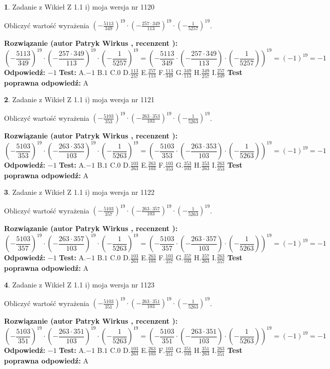 \documentclass[12pt, a4paper]{article}
\theoremstyle{definition} %
\newtheorem{zad}{}
\newcommand{\zadStart}[1]{\begin{zad}#1\newline}
\newcommand{\zadStop}{\end{zad}}
\newcommand{\rozwStart}[2]{\noindent \textbf{Rozwiązanie (autor #1 , recenzent #2): }\newline}
\newcommand{\rozwStop}{\newline}
\newcommand{\odpStart}{\noindent \textbf{Odpowiedź:}\newline}
\newcommand{\odpStop}{\newline}
\newcommand{\testStart}{\noindent \textbf{Test:}\newline}
\newcommand{\testStop}{\newline}
\newcommand{\kluczStart}{\noindent \textbf{Test poprawna odpowiedź:}\newline}
\newcommand{\kluczStop}{\newline}
\begin{document}
\zadStart{Zadanie z Wikieł Z 1.1 i) moja wersja nr 1120}

Obliczyć wartość wyrażenia $(-\frac{5113}{349})^{19} \cdot (-\frac{257 \cdot 349}{113})^{19} \cdot (-\frac{1}{5257})^{19}$.
\zadStop
\rozwStart{Patryk Wirkus}{}
$$(-\frac{5113}{349})^{19} \cdot (-\frac{257 \cdot 349}{113})^{19} \cdot (-\frac{1}{5257})^{19} = (-\frac{5113}{349} \cdot (-\frac{257 \cdot 349}{113}) \cdot (-\frac{1}{5257}))^{19} = (-1)^{19} = -1$$
\rozwStop
\odpStart
$-1$
\odpStop
\testStart
A.$-1$ B.$1$ C.$0$ D.$\frac{113}{257}$ E.$\frac{257}{113}$
F.$\frac{113}{349}$ G.$\frac{349}{113}$
H.$\frac{349}{257}$
I.$\frac{257}{349}$
\testStop
\kluczStart
A
\kluczStop



\zadStart{Zadanie z Wikieł Z 1.1 i) moja wersja nr 1121}

Obliczyć wartość wyrażenia $(-\frac{5103}{353})^{19} \cdot (-\frac{263 \cdot 353}{103})^{19} \cdot (-\frac{1}{5263})^{19}$.
\zadStop
\rozwStart{Patryk Wirkus}{}
$$(-\frac{5103}{353})^{19} \cdot (-\frac{263 \cdot 353}{103})^{19} \cdot (-\frac{1}{5263})^{19} = (-\frac{5103}{353} \cdot (-\frac{263 \cdot 353}{103}) \cdot (-\frac{1}{5263}))^{19} = (-1)^{19} = -1$$
\rozwStop
\odpStart
$-1$
\odpStop
\testStart
A.$-1$ B.$1$ C.$0$ D.$\frac{103}{263}$ E.$\frac{263}{103}$
F.$\frac{103}{353}$ G.$\frac{353}{103}$
H.$\frac{353}{263}$
I.$\frac{263}{353}$
\testStop
\kluczStart
A
\kluczStop



\zadStart{Zadanie z Wikieł Z 1.1 i) moja wersja nr 1122}

Obliczyć wartość wyrażenia $(-\frac{5103}{357})^{19} \cdot (-\frac{263 \cdot 357}{103})^{19} \cdot (-\frac{1}{5263})^{19}$.
\zadStop
\rozwStart{Patryk Wirkus}{}
$$(-\frac{5103}{357})^{19} \cdot (-\frac{263 \cdot 357}{103})^{19} \cdot (-\frac{1}{5263})^{19} = (-\frac{5103}{357} \cdot (-\frac{263 \cdot 357}{103}) \cdot (-\frac{1}{5263}))^{19} = (-1)^{19} = -1$$
\rozwStop
\odpStart
$-1$
\odpStop
\testStart
A.$-1$ B.$1$ C.$0$ D.$\frac{103}{263}$ E.$\frac{263}{103}$
F.$\frac{103}{357}$ G.$\frac{357}{103}$
H.$\frac{357}{263}$
I.$\frac{263}{357}$
\testStop
\kluczStart
A
\kluczStop



\zadStart{Zadanie z Wikieł Z 1.1 i) moja wersja nr 1123}

Obliczyć wartość wyrażenia $(-\frac{5103}{351})^{19} \cdot (-\frac{263 \cdot 351}{103})^{19} \cdot (-\frac{1}{5263})^{19}$.
\zadStop
\rozwStart{Patryk Wirkus}{}
$$(-\frac{5103}{351})^{19} \cdot (-\frac{263 \cdot 351}{103})^{19} \cdot (-\frac{1}{5263})^{19} = (-\frac{5103}{351} \cdot (-\frac{263 \cdot 351}{103}) \cdot (-\frac{1}{5263}))^{19} = (-1)^{19} = -1$$
\rozwStop
\odpStart
$-1$
\odpStop
\testStart
A.$-1$ B.$1$ C.$0$ D.$\frac{103}{263}$ E.$\frac{263}{103}$
F.$\frac{103}{351}$ G.$\frac{351}{103}$
H.$\frac{351}{263}$
I.$\frac{263}{351}$
\testStop
\kluczStart
A
\kluczStop
\end{document}
